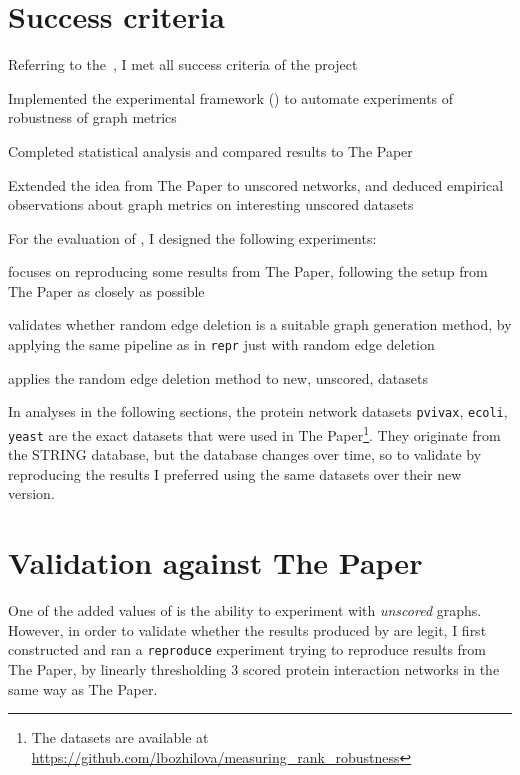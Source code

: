\section{Success criteria}

Referring to the~, I met all success criteria of the project


\begin{todolist}
    \item[\done] Implemented the experimental framework (\graffs) to automate experiments of robustness of graph metrics
    \item[\done] Completed statistical analysis and compared results to The Paper
    \item[\done] Extended the idea from The Paper to unscored networks, and deduced empirical observations about graph metrics on interesting unscored datasets
\end{todolist}

For the evaluation of \graffs, I designed the following experiments:
\begin{description}[itemsep=\zerospace]
    \item[\texttt{reproduce}] focuses on reproducing some results from The Paper, following the setup from The Paper as closely as possible
    \item[\texttt{random-edges}] validates whether random edge deletion is a suitable graph generation method, by applying the same pipeline as in \texttt{repr} just with random edge deletion
    \item[\texttt{unscored}] applies the random edge deletion method to new, unscored, datasets
\end{description}

In analyses in the following sections, the protein network datasets \texttt{pvivax}, \texttt{ecoli}, \texttt{yeast} are the exact datasets that were used in The Paper\footnote{The datasets are available at \url{https://github.com/lbozhilova/measuring_rank_robustness}}.
They originate from the STRING database, but the database changes over time, so to validate \graffs by reproducing the results I preferred using the same datasets over their new version.


\section{Validation against The Paper}

One of the added values of \graffs is the ability to experiment with \textsl{unscored} graphs.
However, in order to validate whether the results produced by \graffs are legit, I first constructed and ran a \texttt{reproduce} experiment trying to reproduce results from The Paper, by linearly thresholding 3 scored protein interaction networks in the same way as The Paper.

